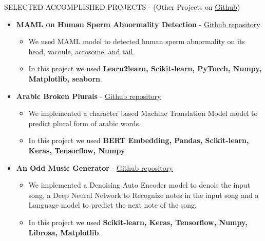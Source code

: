 \documentclass[]{CV}
\begin{document}
\vspace{-4mm}
\begin{section}{SELECTED ACCOMPLISHED PROJECTS { - (Other Projects on \href{https://github.com/amirkasaei}{Github})}}
    \begin{itemize}
\item \textbf{MAML on Human Sperm Abnormality Detection} - \href{https://github.com/amirkasaei/Modified-Human-Sperm-Morphology-Analysis}{Github repository}
\begin{itemize}
        \item We used MAML model to detected human sperm abnormality on its head, vacoule, acrosome, and tail. \vspace{-2mm}
        \item In this project we used \textbf{Learn2learn, Scikit-learn, PyTorch, Numpy, Matplotlib, seaborn}.
    \end{itemize}
    
\item \textbf{Arabic Broken Plurals} - \href{https://github.com/amirkasaei/Arabic-Broken-Plurals}{Github repository}
   \begin{itemize}
        \item We implemented a character based Machine Translation Model model to predict plural form of arabic words.\vspace{-2mm}
        \item In this project we used \textbf{BERT Embedding, Pandas, Scikit-learn, Keras, Tensorflow, Numpy}.
    \end{itemize}

\item \textbf{An Odd Music Generator} - \href{https://github.com/amirkasaei/An-Odd-Music-Generator}{Github repository}
   \begin{itemize}
        \item We implemented a Denoising Auto Encoder model to denois the input song, a Deep Neural Network to Recognize notes in the input song and a Language model to predict the next note of  the song.\vspace{-2mm}
        \item In this project we used \textbf{Scikit-learn, Keras, Tensorflow, Numpy, Librosa, Matplotlib}.
    \end{itemize}


\end{itemize}
\end{section}
\end{document}
